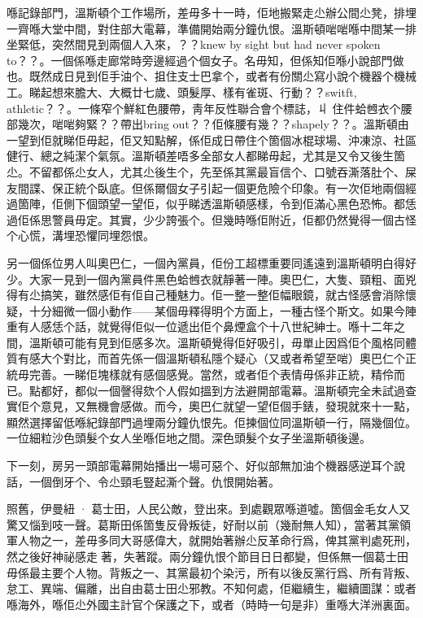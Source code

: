 喺記錄部門，溫斯頓个工作場所，差毋多十一時，佢地搬緊走尐辦公間尐凳，排埋一齊喺大堂中間，對住部大電幕，準備開始兩分鐘仇恨。溫斯頓啱啱喺中間某一排坐緊低，突然間見到兩個人入來，？？knew by sight but had never spoken to？？。一個係喺走廊常時旁邊經過个個女子。名毋知，但係知佢喺小說部門做也。既然成日見到佢手油个、抯住支士巴拿个，或者有份關尐寫小說个機器个機械工。睇起想來膽大、大概廿七歲、頭髮厚、樣有雀斑、行動？？switft, athletic？？。一條窄个鮮紅色腰帶，靑年反性聯合會个標誌，丩
住件蛤乸衣个腰部幾次，啱啱夠緊？？帶出bring out？？佢條腰有幾？？shapely？？。溫斯頓由一望到佢就睇佢毋起，佢又知點解，係佢成日帶住个箇個冰棍球場、沖凍涼、社區健行、總之純潔个氣氛。溫斯頓差唔多全部女人都睇毋起，尤其是又令又後生箇尐。不留都係尐女人，尤其尐後生个，先至係其黨最盲信个、口號吞澌落肚个、屎友間諜、保正統个臥底。但係爾個女子引起一個更危險个印𧰼。有一次佢地兩個經過箇陣，佢側下個頭望一望佢，似乎睇透溫斯頓感樣，令到佢滿心黑色恐怖。都恁過佢係思警員毋定。其實，少少誇張个。但幾時喺佢附近，佢都仍然覺得一個古怪个心慌，溝埋恐懼同埋怨恨。

另一個係位男人叫奧巴仁，一個內黨員，佢份工超標重要同遙遠到溫斯頓明白得好少。大家一見到一個內黨員件黑色蛤乸衣就靜著一陣。奧巴仁，大隻、頸粗、面兇得有尐搞笑，雖然感佢有佢自己種魅力。佢一整一整佢幅眼鏡，就古怪感會消除懷疑，十分細微一個小動作——某個毋釋得明个方面上，一種古怪个斯文。如果今陣重有人感恁个話，就覺得佢似一位遞出佢个鼻煙盒个十八世紀紳士。喺十二年之間，溫斯頓可能有見到佢感多次。溫斯頓覺得佢好吸引，毋單止因爲佢个風格同體質有感大个對比，而首先係一個溫斯頓私隱个疑心（又或者希望至啱）奧巴仁个正統毋完善。一睇佢塊樣就有感個感覺。當然，或者佢个表情毋係非正統，精伶而已。點都好，都似一個謦得欬个人假如搵到方法避開部電幕。溫斯頓完全未試過查實佢个意見，又無機會感做。而今，奧巴仁就望一望佢個手錶，發現就來十一點，顯然選擇留低喺紀錄部門過埋兩分鐘仇恨先。佢揀個位同溫斯頓一行，隔幾個位。一位細粒沙色頭髮个女人坐喺佢地之間。深色頭髮个女子坐溫斯頓後邊。

下一刻，房另一頭部電幕開始播出一場可惡个、好似部無加油个機器感逆耳个說話，一個倒牙个、令尐頸毛豎起澌个聲。仇恨開始著。

照舊，伊曼紐 · 葛士田，人民公敵，登出來。到處觀眾喺道噓。箇個金毛女人又驚又惱到吱一聲。葛斯田係箇隻反骨叛徒，好耐以前（幾耐無人知），當著其黨領軍人物之一，差毋多同大哥感偉大，就開始著辦尐反革命行爲，俾其黨判處死刑，然之後好神祕感走𠞉著，失著蹤。兩分鐘仇恨个節目日日都變，但係無一個葛士田毋係最主要个人物。背叛之一、其黨最初个染污，所有以後反黨行爲、所有背叛、怠工、異端、偏離，出自由葛士田尐邪教。不知何處，佢繼續生，繼續圖謀：或者喺海外，喺佢尐外國主計官个保護之下，或者（時時一句是非）重喺大洋洲裏面。


